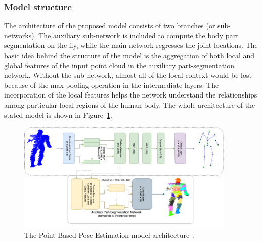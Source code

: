 \subsubsection{Model structure}
The architecture of the proposed model consists of two branches (or sub-networks). The auxiliary sub-network is included to compute the body part segmentation on the fly, while the main network regresses the joint locations. The basic idea behind the structure of the model is the aggregation of both local and global features of the input point cloud in the auxiliary part-segmentation network. Without the sub-network, almost all of the local context would be lost because of the max-pooling operation in the intermediate layers. The incorporation of the local features helps the network understand the relationships among particular local regions of the human body. The whole architecture of the stated model is shown in Figure~\ref{fig:PBPE}.\par
\vspace{5mm}

\begin{figure}[H]
\begin{center}
  \includegraphics[height=200px]{images/implementation/pbpe2.PNG}
  \caption{The Point-Based Pose Estimation model architecture~\cite{Ali19}.}
  \label{fig:PBPE}
\end{center}
\end{figure}

